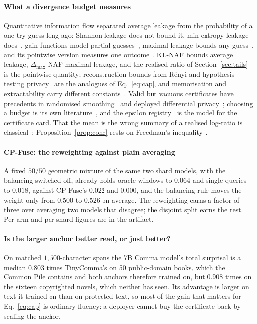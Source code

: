 \paragraph{What a divergence budget measures}
Quantitative information flow separated average leakage from the probability of a one-try guess long ago: Shannon leakage does not bound it, min-entropy leakage does~\cite{smith2009foundations}, gain functions model partial guesses~\cite{alvim2012measuring}, maximal leakage bounds any guess~\cite{issa2020operational}, and its pointwise version measures one outcome~\cite{saeidian2023pointwise}. KL-NAF bounds average leakage, $\Delta_{\max}$-NAF maximal leakage, and the realised ratio of Section~\ref{sec:tails} is the pointwise quantity; reconstruction bounds from R\'enyi and hypothesis-testing privacy~\cite{guo2022bounding,balle2022reconstructing,hayes2023bounding,kaissis2023bounding} are the analogues of Eq.~\eqref{eq:cap}, and memorisation and extractability carry different constants~\cite{che2026memorization}. Valid but vacuous certificates have precedents in randomised smoothing~\cite{cohen2019certified,kumar2020curse,blum2020random} and deployed differential privacy~\cite{jayaraman2019evaluating}; choosing a budget is its own literature~\cite{lee2011howmuch,hsu2014economic,brown2022privacy,cyffers2025setting}, and the epsilon registry~\cite{dwork2019expose} is the model for the certificate card. That the mean is the wrong summary of a realised log-ratio is classical~\cite{cover2006elements,kontoyiannis2014optimal,chatterjee2018sample}; Proposition~\ref{prop:conc} rests on Freedman's inequality~\cite{freedman1975tail,tropp2011freedman,howard2021timeuniform}.


\paragraph{CP-Fuse: the reweighting against plain averaging}
A fixed $50/50$ geometric mixture of the same two shard models, with the balancing switched off, already holds oracle windows to $0.064$ and single queries to $0.018$, against CP-Fuse's $0.022$ and $0.000$, and the balancing rule moves the weight only from $0.500$ to $0.526$ on average. The reweighting earns a factor of three over averaging two models that disagree; the disjoint split earns the rest. Per-arm and per-shard figures are in the artifact.

\paragraph{Is the larger anchor better read, or just better?}
On matched $1{,}500$-character spans the 7B Comma model's total surprisal is a median $0.803$ times TinyComma's on 50 public-domain books, which the Common Pile contains and both anchors therefore trained on, but $0.908$ times on the sixteen copyrighted novels, which neither has seen. Its advantage is larger on text it trained on than on protected text, so most of the gain that matters for Eq.~\eqref{eq:cap} is ordinary fluency: a deployer cannot buy the certificate back by scaling the anchor.
